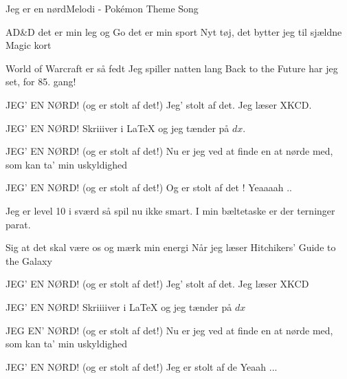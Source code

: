 \begin{sang}{Jeg er en nørd}{Melodi - Pokémon Theme Song}
\begin{vers}
AD\&D det er min leg
og Go det er min sport
Nyt tøj, det bytter jeg
til sjældne Magic kort
\end{vers}
\begin{vers}
World of Warcraft er så fedt
Jeg spiller natten lang
Back to the Future har jeg set,
for 85. gang!
\end{vers}
\begin{vers}
JEG' EN NØRD!
 (og er stolt af det!)
Jeg' stolt af det.
Jeg læser XKCD.
\end{vers}
\begin{vers}
JEG' EN NØRD!
Skriiiver i \LaTeX{}
og jeg tænder på $dx$.
\end{vers}
\begin{vers}
JEG' EN NØRD!
 (og er stolt af det!)
Nu er jeg ved
at finde en at nørde med,
som kan ta' min uskyldighed
\end{vers}
\begin{vers}
JEG' EN NØRD!
 (og er stolt af det!)
Og er stolt af det !
Yeaaaah ..
\end{vers}
\begin{vers}
Jeg er level 10 i sværd
så spil nu ikke smart.
I min bæltetaske er 
der terninger parat.
\end{vers}
\begin{vers}
Sig at det skal være os
og mærk min energi
Når jeg læser Hitchikers'
Guide to the Galaxy
\end{vers}
\begin{vers}
JEG' EN NØRD!
 (og er stolt af det!)
Jeg' stolt af det.
Jeg læser XKCD
\end{vers}
\begin{vers}
JEG' EN NØRD!
Skriiiiver i \LaTeX{}
og jeg tænder på $dx$
\end{vers}
\begin{vers}
JEG EN' NØRD!
 (og er stolt af det!)
Nu er jeg ved
at finde en at nørde med,
som kan ta' min uskyldighed
\end{vers}
\begin{vers}
JEG' EN NØRD!
 (og er stolt af det!)
Jeg er stolt af de
Yeaah ...
\end{vers}
\laps
\end{sang}

